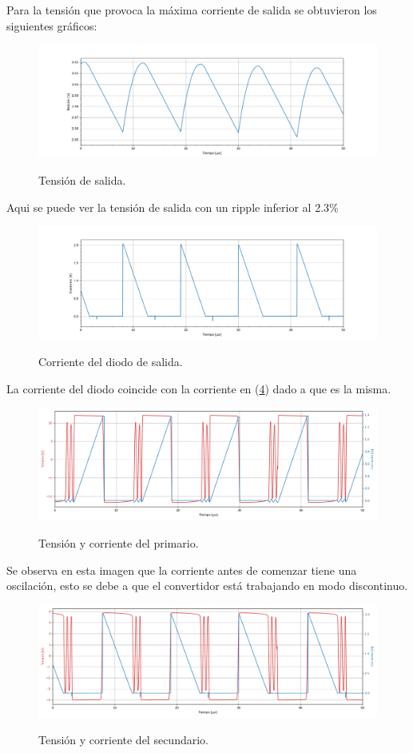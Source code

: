 Para la tensión que provoca la máxima corriente de salida se obtuvieron los siguientes gráficos:
\begin{figure}[H]
	\centering
	\includegraphics[width=\linewidth]{ImagenesParteII/ Vo.png}
	\label{fig:vo}
	\caption{Tensión de salida.}
\end{figure}
Aqui se puede ver la tensión de salida con un ripple inferior al 2.3\%
\begin{figure}[H]
	\centering
	\includegraphics[width=\linewidth]{ImagenesParteII/Idiodo.png}
	\label{fig:idiodo}
	\caption{Corriente del diodo de salida.}
\end{figure}
La corriente del diodo coincide con la corriente en (\ref{fig:secundario}) dado a que es la misma.
\begin{figure}[H]
	\centering
	\includegraphics[width=0.9\linewidth]{ImagenesParteII/Primario.png}
	\label{fig:primario}
	\caption{Tensión y corriente del primario.}
\end{figure}
Se observa en esta imagen que la corriente antes de comenzar tiene una oscilación, esto se debe a que el convertidor está trabajando en modo discontinuo.
\begin{figure}[H]
	\centering
	\includegraphics[width=0.9\linewidth]{ImagenesParteII/Secundario.png}
	\label{fig:secundario}
	\caption{Tensión y corriente del secundario.}
\end{figure}

